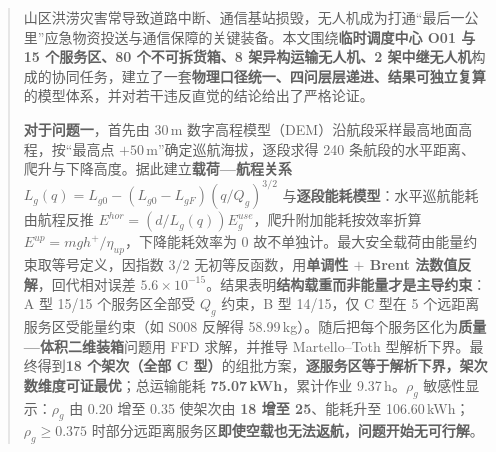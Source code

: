 \maketitle%
\thispagestyle{plain}%
\begin{abstract}%

	山区洪涝灾害常导致道路中断、通信基站损毁，无人机成为打通“最后一公里”应急物资投送与通信保障的关键装备。本文围绕\textbf{临时调度中心 O01 与 15 个服务区、80 个不可拆货箱、8 架异构运输无人机、2 架中继无人机}构成的协同任务，建立了一套\textbf{物理口径统一、四问层层递进、结果可独立复算}的模型体系，并对若干违反直觉的结论给出了严格论证。

	\textbf{对于问题一}，首先由 30\,m 数字高程模型（DEM）沿航段采样最高地面高程，按“最高点 $+50$\,m”确定巡航海拔，逐段求得 240 条航段的水平距离、爬升与下降高度。据此建立\textbf{载荷—航程关系} $L_{g}(q)=L_{g0}-(L_{g0}-L_{gF})(q/Q_{g})^{3/2}$ 与\textbf{逐段能耗模型}：水平巡航能耗由航程反推 $E^{hor}=(d/L_{g}(q))E_{g}^{use}$，爬升附加能耗按效率折算 $E^{up}=mgh^{+}/\eta_{up}$，下降能耗效率为 0 故不单独计。最大安全载荷由能量约束取等号定义，因指数 $3/2$ 无初等反函数，用\textbf{单调性 $+$ Brent 法数值反解}，回代相对误差 $5.6\times10^{-15}$。结果表明\textbf{结构载重而非能量才是主导约束}：A 型 15/15 个服务区全部受 $Q_{g}$ 约束，B 型 14/15，仅 C 型在 5 个远距离服务区受能量约束（如 S008 反解得 58.99\,kg）。随后把每个服务区化为\textbf{质量—体积二维装箱}问题用 FFD 求解，并推导 Martello--Toth 型解析下界。最终得到\textbf{18 个架次（全部 C 型）}的组批方案，\textbf{逐服务区等于解析下界，架次数维度可证最优}；总运输能耗 \textbf{75.07\,kWh}，累计作业 9.37\,h。$\rho_{g}$ 敏感性显示：$\rho_{g}$ 由 0.20 增至 0.35 使架次由 \textbf{18 增至 25}、能耗升至 106.60\,kWh；$\rho_{g}\ge0.375$ 时部分远距离服务区\textbf{即使空载也无法返航，问题开始无可行解}。


\end{abstract}
